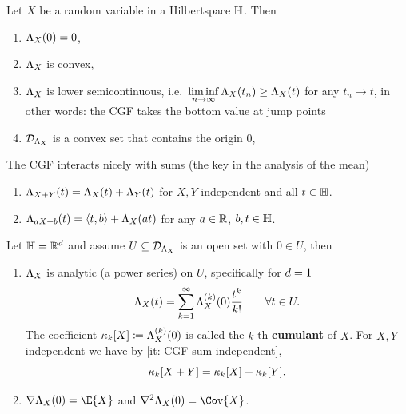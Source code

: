 \begin{lemma}
    \label{lem: properties of CGF}
    Let \(X\) be a random variable in a Hilbertspace \(\mathbb{H}\). Then
    \begin{enumerate}[label=\normalfont{(\arabic*)}, noitemsep]
        \item\label{it: CGF(0)=0} \(\Lambda_X(0) = 0\),
        \item\label{it: CGF convex} \(\Lambda_X\) is convex,
        \item\label{it: CGF lower semicontinuous} \(\Lambda_X\) is lower semicontinuous, i.e.\ \(\liminf\limits_{n\to\infty} \Lambda_X(t_n) \ge \Lambda_X(t)\) for any \(t_n\to t\),
        in other words: the CGF takes the bottom value at jump points

        \item\label{it: CGF effective domain is convex} \(\mathcal{D}_{\Lambda_X}\) is a convex set that contains the origin \(0\),
    \end{enumerate} 
    The CGF interacts nicely with sums (the key in the analysis of the mean)
    \begin{enumerate}[label=\normalfont{(\arabic*)}, noitemsep, resume]
        \item\label{it: CGF sum independent} \(\Lambda_{X+Y}(t) = \Lambda_X(t) + \Lambda_Y(t)\) for \(X,Y\) independent and all \(t\in \mathbb{H}\).
        \item\label{it: CGF affine} \(\Lambda_{aX + b}(t) = \langle t, b\rangle + \Lambda_X(a t)\)
        for any \(a\in \mathbb{R}\), \(b, t\in \mathbb{H}\).
    \end{enumerate}
    Let \(\mathbb{H}=\mathbb{R}^d\) and assume \(U \subseteq \mathcal{D}_{\Lambda_X}\) is an open
    set with \(0\in U\), then
    \begin{enumerate}[label=\normalfont{(\arabic*)}, noitemsep, resume]
        \item\label{it: CGF analytic} \(\Lambda_X\) is analytic (a power series) on \(U\), specifically for \(d=1\)
        \[
            \Lambda_X(t)
            = \sum_{k=1}^\infty \Lambda_X^{(k)}(0)\frac{t^k}{k!}
            \qquad \forall t\in U.
        \]
        The coefficient \(\kappa_k[X] \coloneq \Lambda_X^{(k)}(0)\) is called the \(k\)-th \textbf{cumulant} of \(X\).
        For \(X,Y\) independent we have by \ref{it: CGF sum independent},
        \[
            \kappa_k[X+Y] = \kappa_k[X] + \kappa_k[Y].
        \]
        \item\label{it: CGF gradient and Hessian} \(\nabla \CGF_X(0) = \E{X}\) and \(\nabla^2\CGF_X(0) = \Cov{X}\).
    \end{enumerate}
\end{lemma}
